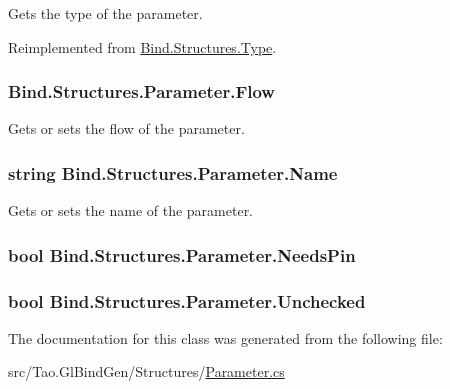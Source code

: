 Gets the type of the parameter. 



Reimplemented from \hyperlink{class_bind_1_1_structures_1_1_type_ae54c82fec549fa18561c2ff88d5615ca}{Bind.Structures.Type}.

\hypertarget{class_bind_1_1_structures_1_1_parameter_a512093b92ac7b310fb69abdf74e91319}{
\subsubsection[{Flow}]{ Bind.Structures.Parameter.Flow}}
\label{class_bind_1_1_structures_1_1_parameter_a512093b92ac7b310fb69abdf74e91319}


Gets or sets the flow of the parameter. 

\hypertarget{class_bind_1_1_structures_1_1_parameter_a10ddab5e51ff1530739413a4a1db5443}{
\subsubsection[{Name}]{\setlength{\rightskip}{0pt plus 5cm}string Bind.Structures.Parameter.Name}}
\label{class_bind_1_1_structures_1_1_parameter_a10ddab5e51ff1530739413a4a1db5443}


Gets or sets the name of the parameter. 

\hypertarget{class_bind_1_1_structures_1_1_parameter_a8da6ababf2a23a25ff2f010525a38979}{
\subsubsection[{NeedsPin}]{\setlength{\rightskip}{0pt plus 5cm}bool Bind.Structures.Parameter.NeedsPin}}
\label{class_bind_1_1_structures_1_1_parameter_a8da6ababf2a23a25ff2f010525a38979}
\hypertarget{class_bind_1_1_structures_1_1_parameter_ac0bc7f8e84e39a405942e1fecd139153}{
\subsubsection[{Unchecked}]{\setlength{\rightskip}{0pt plus 5cm}bool Bind.Structures.Parameter.Unchecked}}
\label{class_bind_1_1_structures_1_1_parameter_ac0bc7f8e84e39a405942e1fecd139153}


The documentation for this class was generated from the following file:\begin{DoxyCompactItemize}
\item 
src/Tao.GlBindGen/Structures/\hyperlink{_parameter_8cs}{Parameter.cs}\end{DoxyCompactItemize}
